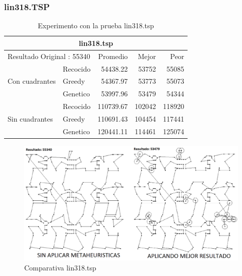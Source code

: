 \subsubsection{lin318.TSP}
\begin{table}[hbtp]
 \centering
	\begin{tabular}{ | l   l | r | r | r |   }
     \hline\multicolumn{5}{|c|}{ \rowcolor[gray]{0.8}lin318.tsp} \\\hline
     \multicolumn{2}{|l|}{Resultado Original : 55340} & Promedio & Mejor & Peor \\ \hline
                        & Recocido  & 54438.22 & 53752 & 55085  \\ 
         Con cuadrantes & Greedy    & 54367.97 & 53773 & 55073  \\ 
                        & Genetico  & 53997.96 & 53479 & 54344  \\ \hline
                        & Recocido  & 110739.67 & 102042 & 118920   \\ 
         Sin cuadrantes & Greedy    & 110691.43 & 104454 & 117441   \\ 
                        & Genetico  & 120441.11 & 114461 & 125074    \\ \hline
    \end{tabular}
    \caption{Experimento con la prueba lin318.tsp}
    \label{table:EXP_lin318.tsp}
\end{table}
 \begin{figure}[hbtp]
    \centering
        \includegraphics[width=1\textwidth]{PruebasResultados/Experimentos_Comparativas/lin318.png}
        \caption{Comparativa lin318.tsp}
        \label{fig:lin318_comparativa.png}
\end{figure}

